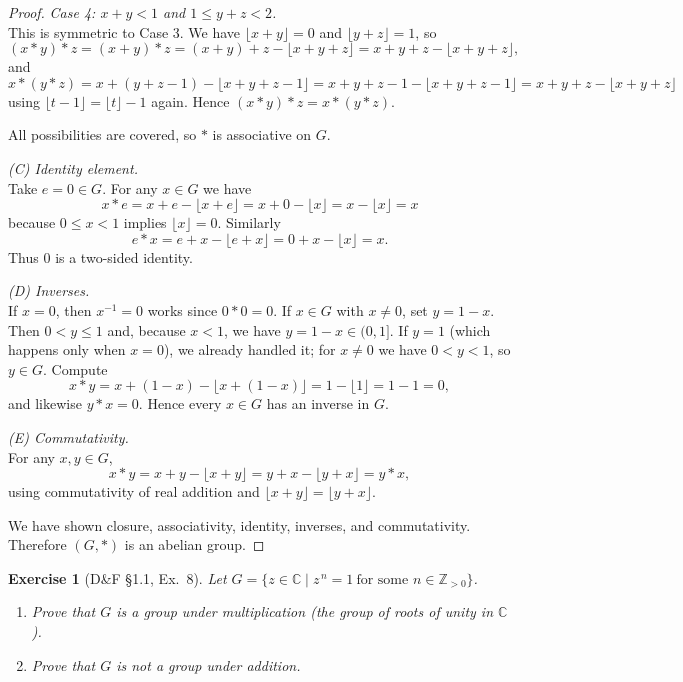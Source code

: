 \documentclass[12pt]{article}
\newtheorem{exercise}[theorem]{Exercise}
\theoremstyle{definition}
\begin{document}
\begin{proof}
\noindent
\emph{Case 4: $x+y<1$ and $1\le y+z<2$.}\\
This is symmetric to Case 3. We have $\lfloor x+y\rfloor=0$ and $\lfloor y+z\rfloor=1$, so
\[
(x*y)*z=(x+y)*z=(x+y)+z-\lfloor x+y+z\rfloor=x+y+z-\lfloor x+y+z\rfloor,
\]
and
\[
x*(y*z)=x+(y+z-1)-\lfloor x+y+z-1\rfloor
=x+y+z-1-\lfloor x+y+z-1\rfloor
=x+y+z-\lfloor x+y+z\rfloor
\]
using $\lfloor t-1\rfloor=\lfloor t\rfloor-1$ again. Hence $(x*y)*z=x*(y*z)$.

\noindent
All possibilities are covered, so $*$ is associative on $G$.

\dotfill

\noindent\emph{(C) Identity element.}\\

\noindent
Take $e=0\in G$. For any $x\in G$ we have
\[
x*e=x+e-\lfloor x+e\rfloor=x+0-\lfloor x\rfloor=x-\lfloor x\rfloor=x
\]
because $0\le x<1$ implies $\lfloor x\rfloor=0$. Similarly
\[
e*x=e+x-\lfloor e+x\rfloor=0+x-\lfloor x\rfloor=x.
\]
Thus $0$ is a two-sided identity.

\dotfill

\noindent\emph{(D) Inverses.}\\

\noindent
If $x=0$, then $x^{-1}=0$ works since $0*0=0$. If $x\in G$ with $x\neq 0$, set $y=1-x$.
Then $0<y\le 1$ and, because $x<1$, we have $y=1-x\in (0,1]$.
If $y=1$ (which happens only when $x=0$), we already handled it; for $x\neq 0$ we have $0<y<1$, so $y\in G$.
Compute
\[
x*y=x+(1-x)-\lfloor x+(1-x)\rfloor=1-\lfloor 1\rfloor=1-1=0,
\]
and likewise $y*x=0$. Hence every $x\in G$ has an inverse in $G$.

\dotfill

\noindent\emph{(E) Commutativity.}\\

\noindent
For any $x,y\in G$,
\[
x*y=x+y-\lfloor x+y\rfloor=y+x-\lfloor y+x\rfloor=y*x,
\]
using commutativity of real addition and $\lfloor x+y\rfloor=\lfloor y+x\rfloor$.

\dotfill

\noindent
We have shown closure, associativity, identity, inverses, and commutativity.
Therefore $(G,*)$ is an abelian group.
\end{proof}

\newpage

\begin{exercise}[D\&F §1.1, Ex.~8]
Let $G=\{z\in\mathbb{C}\mid z^{\,n}=1\ \text{for some }n\in\mathbb{Z}_{>0}\}$.
\begin{enumerate}
\item Prove that $G$ is a group under multiplication (the group of roots of unity in $\mathbb{C}$).
\item Prove that $G$ is not a group under addition.
\end{enumerate}
\end{exercise}
\end{document}

